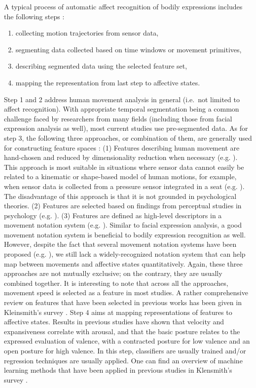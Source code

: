 A typical process of automatic affect recognition of bodily expressions includes the following steps \cite{karg2013body}:
\begin{enumerate}
\item collecting motion trajectories from sensor data,
\item segmenting data collected based on time windows or movement primitives,
\item describing segmented data using the selected feature set,
\item mapping the representation from last step to affective states.
\end{enumerate}
Step 1 and 2 address human movement analysis in general (i.e.~not limited to affect recognition). With appropriate temporal segmentation being a common challenge faced by researchers from many fields (including those from facial expression analysis as well), most current studies use pre-segmented data. As for step 3, the following three approaches, or combination of them, are generally used for constructing feature spaces \cite{karg2013body}: (1) Features describing human movement are hand-chosen and reduced by dimensionality reduction when necessary (e.g. \cite{nicolaou2011continuous}). This approach is most suitable in situations where sensor data cannot easily be related to a kinematic or shape-based model of human motions, for example, when sensor data is collected from a pressure sensor integrated in a seat (e.g. \cite{d2009automatic}). The disadvantage of this approach is that it is not grounded in psychological theories. (2) Features are selected based on findings from perceptual studies in psychology (e.g. \cite{karg2010recognition}). (3) Features are defined as high-level descriptors in a movement notation system (e.g. \cite{castellano2007recognising}). Similar to facial expression analysis, a good movement notation system is beneficial to bodily expression recognition as well. However, despite the fact that several movement notation systems have been proposed (e.g. \cite{birdwhistell2011kinesics}), we still lack a widely-recognized notation system that can help map between movements and affective states quantitatively. Again, these three approaches are not mutually exclusive; on the contrary, they are usually combined together. It is interesting to note that across all the approaches, movement speed is selected as a feature in most studies. A rather comprehensive review on features that have been selected in previous works has been given in Kleinsmith's survey \cite{kleinsmith2013affective}. 
Step 4 aims at mapping representations of features to affective states. Results in previous studies \cite{beck2010interpretation} have shown that velocity and expansiveness correlate with arousal, and that the basic posture relates to the expressed evaluation of valence, with a contracted posture for low valence and an open posture for high valence. In this step, classifiers are usually trained and/or regression techniques are usually applied. One can find an overview of machine learning methods that have been applied in previous studies in Klensmith's survey \cite{kleinsmith2013affective}.

